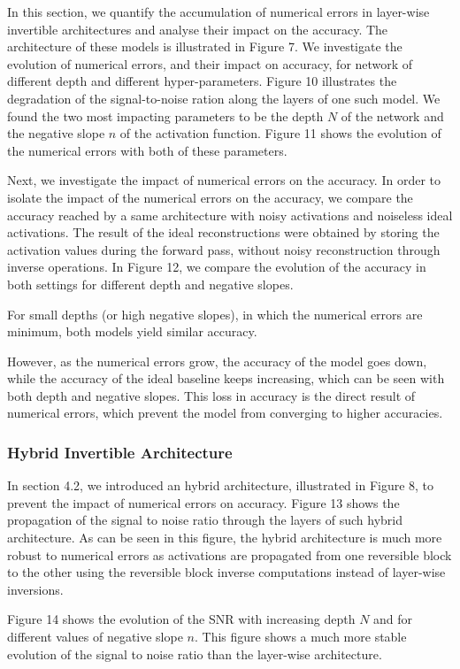 \documentclass[twocolumn]{bmcart}
\begin{document}
In this section, we quantify the accumulation of numerical errors in layer-wise invertible architectures and analyse their impact on the accuracy.
The architecture of these models is illustrated in Figure 7.
We investigate the evolution of numerical errors, and their impact on accuracy, for network of different depth and different hyper-parameters. 
Figure 10 illustrates the degradation of the signal-to-noise ration along the layers of one such model. 
We found the two most impacting parameters to be the depth $N$ of the network and the negative slope $n$ of the activation function.
Figure 11 shows the evolution of the numerical errors with both of these parameters.

Next, we investigate the impact of numerical errors on the accuracy.
In order to isolate the impact of the numerical errors on the accuracy, 
we compare the accuracy reached by a same architecture with noisy activations and noiseless ideal activations.
The result of the ideal reconstructions were obtained by storing the activation values during the forward pass, 
without noisy reconstruction through inverse operations. 
In Figure 12, we compare the evolution of the accuracy in both settings for different depth and negative slopes.

For small depths (or high negative slopes), in which the numerical errors are minimum, both models yield similar accuracy.

However, as the numerical errors grow, the accuracy of the model goes down, 
while the accuracy of the ideal baseline keeps increasing, 
which can be seen with both depth and negative slopes.
This loss in accuracy is the direct result of numerical errors, 
which prevent the model from converging to higher accuracies.

\subsubsection{Hybrid Invertible Architecture}

In section 4.2, we introduced an hybrid architecture, 
illustrated in Figure 8, to prevent the impact of numerical errors on accuracy.
Figure 13 shows the propagation of the signal to noise ratio through the layers of such hybrid architecture.
As can be seen in this figure, the hybrid architecture is much more robust to numerical errors as activations 
are propagated from one reversible block to the other using the reversible block inverse computations instead of layer-wise inversions. 

Figure 14 shows the evolution of the SNR with increasing depth $N$ and for different values of negative slope $n$.
This figure shows a much more stable evolution of the signal to noise ratio than the layer-wise architecture. 
\end{document}
